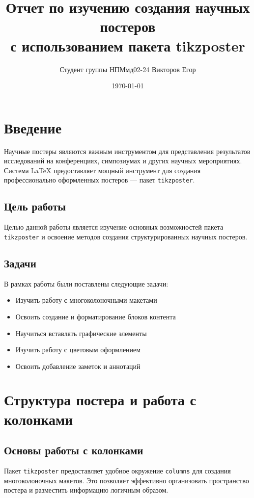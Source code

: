 \documentclass[12pt,a4paper]{article}
\title{\textbf{Отчет по изучению создания научных постеров\\с использованием пакета tikzposter}}
\author{Студент группы НПМмд02-24 Викторов Егор}
\date{\today}
\begin{document}
\maketitle
\tableofcontents
\newpage

\section{Введение}

Научные постеры являются важным инструментом для представления результатов исследований на конференциях, симпозиумах и других научных мероприятиях. Система LaTeX предоставляет мощный инструмент для создания профессионально оформленных постеров — пакет \texttt{tikzposter}.

\subsection{Цель работы}

Целью данной работы является изучение основных возможностей пакета \texttt{tikzposter} и освоение методов создания структурированных научных постеров.

\subsection{Задачи}

В рамках работы были поставлены следующие задачи:
\begin{itemize}
    \item Изучить работу с многоколоночными макетами
    \item Освоить создание и форматирование блоков контента
    \item Научиться вставлять графические элементы
    \item Изучить работу с цветовым оформлением
    \item Освоить добавление заметок и аннотаций
\end{itemize}

\section{Структура постера и работа с колонками}

\subsection{Основы работы с колонками}

Пакет \texttt{tikzposter} предоставляет удобное окружение \texttt{columns} для создания многоколоночных макетов. Это позволяет эффективно организовать пространство постера и разместить информацию логичным образом.
\end{document}
